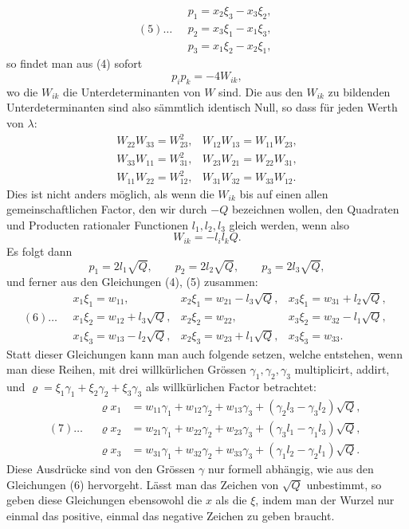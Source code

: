 \documentclass[10pt]{article}
\begin{document}
\[
(5)\ldots\quad
\begin{gathered}
p_1=x_2\xi_3-x_3\xi_2,\\
p_2=x_3\xi_1-x_1\xi_3,\\
p_3=x_1\xi_2-x_2\xi_1,
\end{gathered}
\]
so findet man aus (4) sofort
\[
p_ip_k=-4W_{ik},
\]
wo die \(W_{ik}\) die Unterdeterminanten von \(W\) sind. Die aus den \(W_{ik}\) zu bildenden Unterdeterminanten sind also sämmtlich identisch Null, so dass für jeden Werth von \(\lambda\):
\[
\begin{array}{lll}
W_{22}W_{33}=W_{23}^{2},& W_{12}W_{13}=W_{11}W_{23},\\
W_{33}W_{11}=W_{31}^{2},& W_{23}W_{21}=W_{22}W_{31},\\
W_{11}W_{22}=W_{12}^{2},& W_{31}W_{32}=W_{33}W_{12}.
\end{array}
\]
Dies ist nicht anders möglich, als wenn die \(W_{ik}\) bis auf einen allen gemeinschaftlichen Factor, den wir durch \(-Q\) bezeichnen wollen, den Quadraten und Producten rationaler Functionen \(l_1,l_2,l_3\) gleich werden, wenn also
\[
W_{ik}=-l_il_kQ.
\]
Es folgt dann
\[
p_1=2l_1\sqrt Q,\qquad p_2=2l_2\sqrt Q,\qquad p_3=2l_3\sqrt Q,
\]
und ferner aus den Gleichungen (4), (5) zusammen:
\[
(6)\ldots\quad
\begin{array}{lll}
x_1\xi_1=w_{11},&x_2\xi_1=w_{21}-l_3\sqrt Q,&x_3\xi_1=w_{31}+l_2\sqrt Q,\\
x_1\xi_2=w_{12}+l_3\sqrt Q,&x_2\xi_2=w_{22},&x_3\xi_2=w_{32}-l_1\sqrt Q,\\
x_1\xi_3=w_{13}-l_2\sqrt Q,&x_2\xi_3=w_{23}+l_1\sqrt Q,&x_3\xi_3=w_{33}.
\end{array}
\]
Statt dieser Gleichungen kann man auch folgende setzen, welche entstehen, wenn man diese Reihen, mit drei willkürlichen Grössen \(\gamma_1,\gamma_2,\gamma_3\) multiplicirt, addirt, und \(\varrho=\xi_1\gamma_1+\xi_2\gamma_2+\xi_3\gamma_3\) als willkürlichen Factor betrachtet:
\[
(7)\ldots\quad
\begin{aligned}
\varrho x_1&=w_{11}\gamma_1+w_{12}\gamma_2+w_{13}\gamma_3+(\gamma_2l_3-\gamma_3l_2)\sqrt Q,\\
\varrho x_2&=w_{21}\gamma_1+w_{22}\gamma_2+w_{23}\gamma_3+(\gamma_3l_1-\gamma_1l_3)\sqrt Q,\\
\varrho x_3&=w_{31}\gamma_1+w_{32}\gamma_2+w_{33}\gamma_3+(\gamma_1l_2-\gamma_2l_1)\sqrt Q.
\end{aligned}
\]
Diese Ausdrücke sind von den Grössen \(\gamma\) nur formell abhängig, wie aus den Gleichungen (6) hervorgeht. Lässt man das Zeichen von \(\sqrt Q\) unbestimmt, so geben diese Gleichungen ebensowohl die \(x\) als die \(\xi\), indem man der Wurzel nur einmal das positive, einmal das negative Zeichen zu geben braucht.
\end{document}
